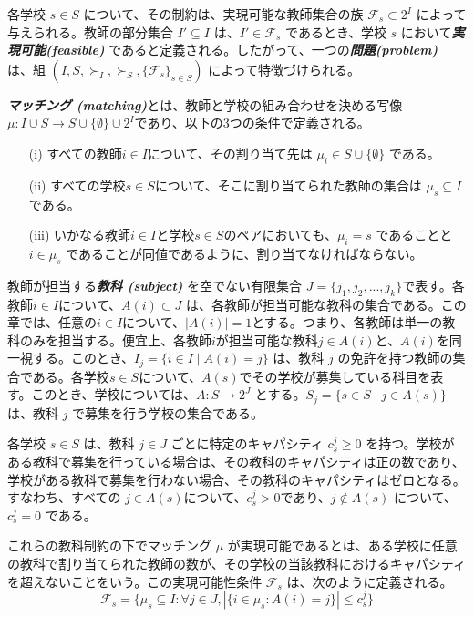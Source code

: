 \documentclass[12pt, a4paper]{article}
\theoremstyle{definition}
\theoremstyle{remark}
\theoremstyle{plain}
\begin{document}
各学校 $s \in S$ について、その制約は、実現可能な教師集合の族 $\mathcal{F}_s \subset 2^{I}$ によって与えられる。教師の部分集合 $I' \subseteq I$ は、$I' \in \mathcal{F}_s$ であるとき、学校 $s$ において\textbf{\textit{実現可能(feasible) }} であると定義される。したがって、一つの\textbf{\textit{問題(problem) }} は、組 $(I, S, \succ_I, \succ_S, \{\mathcal{F}_s\}_{s \in S})$ によって特徴づけられる。

\textbf{\textit{マッチング (matching)}}とは、教師と学校の組み合わせを決める写像$ \mu : I \cup S \to S \cup \{\emptyset\} \cup 2^{I}$であり、以下の3つの条件で定義される。
\begin{itemize}
    \item[(i)] すべての教師$i \in I$について、その割り当て先は $\mu_i \in S \cup \{\emptyset\}$ である。
    \item[(ii)] すべての学校$s \in S$について、そこに割り当てられた教師の集合は $\mu_s \subseteq I$ である。
    \item[(iii)] いかなる教師$i \in I$と学校$s \in S$のペアにおいても、$\mu_i = s$ であることと $i \in \mu_s$ であることが同値であるように、割り当てなければならない。
\end{itemize}



教師が担当する\textbf{\textit{教科 (subject) }}を空でない有限集合 $J = \{j_1, j_2, ..., j_k\}$で表す。各教師$i \in I$について、$A(i) \subset J$ は、各教師が担当可能な教科の集合である。この章では、任意の$i \in I$について、$|A(i)| = 1$とする。つまり、各教師は単一の教科のみを担当する。便宜上、各教師$i$が担当可能な教科$j \in A(i)$と、$A(i)$を同一視する。このとき、$I_j = \{i \in I \mid A(i) = j\}$ は、教科 $j$ の免許を持つ教師の集合である。各学校$s \in S$について、$A(s)$でその学校が募集している科目を表す。このとき、学校については、$A: S \to 2^J$ とする。$S_j = \{s \in S \mid j \in A(s)\}$ は、教科 $j$ で募集を行う学校の集合である。

各学校 $s \in S$ は、教科 $j \in J$ ごとに特定のキャパシティ $c^j_s \geq 0$ を持つ。学校がある教科で募集を行っている場合は、その教科のキャパシティは正の数であり、学校がある教科で募集を行わない場合、その教科のキャパシティはゼロとなる。すなわち、すべての $j \in A(s)$について、$c^j_s > 0$であり、$j \notin A(s)$ について、$c^j_s = 0$ である。

これらの教科制約の下でマッチング $\mu$ が実現可能であるとは、ある学校に任意の教科で割り当てられた教師の数が、その学校の当該教科におけるキャパシティを超えないことをいう。この実現可能性条件 $\mathcal{F}_s$ は、次のように定義される。
\[
\mathcal{F}_s = \{\mu_s \subseteq I : \forall j \in J, |\{i \in \mu_s : A(i) = j \}| \leq c^j_s \}
\]
\end{document}
